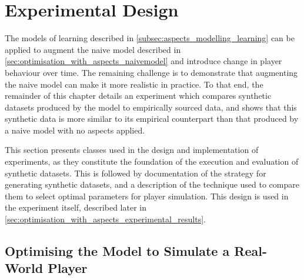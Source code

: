 \section{Experimental Design}
\label{sec:optimisation_with_aspects_experimental_design}

The models of learning described in \cref{subsec:aspects_modelling_learning} can
be applied to augment the naive model described in
\cref{sec:optimisation_with_aspects_naivemodel} and introduce change in player
behaviour over time. The remaining challenge is to demonstrate that augmenting
the naive model can make it more realistic in practice. To that end, the
remainder of this chapter details an experiment which compares synthetic
datasets produced by the model to empirically sourced data, and shows that this
synthetic data is more similar to its empirical counterpart than that produced
by a naive model with no aspects applied.

This section presents classes used in the design and implementation of
experiments, as they constitute the foundation of the execution and evaluation
of synthetic datasets. This is followed by documentation of the strategy for
generating synthetic datasets, and a description of the technique used to
compare them to select optimal parameters for player simulation. This design is
used in the experiment itself, described later in
\cref{sec:optimisation_with_aspects_experimental_results}.


\subsection{Optimising the Model to Simulate a Real-World Player}
\label{exp1:optimisation_strategy}





